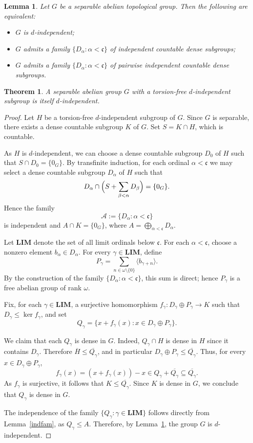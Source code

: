 \documentclass[10pt,a4paper]{amsart}
\newtheorem{lemma}{Lemma}
\newtheorem{theorem}{Theorem}
\newcommand{\LIM}{\mathbf{LIM}}
\def\c {{\mathfrak{c}}}
\begin{document}
\begin{lemma}\label{Le:eq}
Let $G$ be a separable abelian topological group. Then the following are equivalent:
\begin{itemize}
\item[(1)] $G$ is $d$-independent;
\item[(2)] $G$ admits a family $\{D_\alpha:\alpha<\mathfrak c\}$ of independent countable dense subgroups;
\item[(3)] $G$ admits a family $\{D_\alpha:\alpha<\mathfrak c\}$ of pairwise independent countable dense subgroups.
\end{itemize}
\end{lemma}

\begin{theorem}\label{Th:eq}
A separable abelian group $G$ with a torsion-free $d$-independent subgroup
is itself $d$-independent.
\end{theorem}

\begin{proof}
Let $H$ be a torsion-free $d$-independent subgroup of $G$.
Since $G$ is separable, there exists a dense countable subgroup $K$ of $G$.
Set $S=K\cap H$, which is countable.

As $H$ is $d$-independent, we can choose a dense countable subgroup
$D_0$ of $H$ such that $S\cap D_0=\{0_G\}$.
By transfinite induction, for each ordinal $\alpha<\mathfrak{c}$ we may select
a dense countable subgroup $D_\alpha$ of $H$ such that
\[
D_\alpha\cap\Bigl(S+\sum_{\beta<\alpha}D_\beta\Bigr)=\{0_G\}.
\]
Hence the family
\[
\mathcal{A}:=\{D_\alpha:\alpha<\mathfrak{c}\}
\]
is independent and $A\cap K=\{0_G\}$, where $A=\bigoplus_{\alpha<\c} D_\alpha$.

Let $\mathbf{LIM}$ denote the set of all limit ordinals below $\mathfrak{c}$.
For each $\alpha<\mathfrak{c}$, choose a nonzero element
$b_\alpha\in D_\alpha$.
For every $\gamma\in\mathbf{LIM}$, define
\[
P_\gamma=\sum_{n\in\omega\setminus\{0\}}\langle b_{\gamma+n}\rangle.
\]
%
By the construction of the family $\{D_\alpha:\alpha<\mathfrak{c}\}$, this sum
is direct; hence $P_\gamma$ is a free abelian group of rank $\omega$.

Fix, for each $\gamma\in\mathbf{LIM}$, a surjective homomorphism
$f_\gamma\colon D_\gamma\oplus P_\gamma\to K$ such that
$D_\gamma\leq\ker f_\gamma$, and set
\[
Q_\gamma=\{x+f_\gamma(x):x\in D_\gamma\oplus P_\gamma\}.
\]

We claim that each $Q_\gamma$ is dense in $G$.
Indeed, $Q_\gamma\cap H$ is dense in $H$ since it contains $D_\gamma$.
Therefore $\overline{H}\leq\overline{Q_\gamma}$, and in particular
$D_\gamma\oplus P_\gamma\leq\overline{Q_\gamma}$.
Thus, for every $x\in D_\gamma\oplus P_\gamma$,
\[
f_\gamma(x)=(x+f_\gamma(x))-x\in Q_\gamma+\overline{Q_\gamma}
\subseteq\overline{Q_\gamma}.
\]
As $f_\gamma$ is surjective, it follows that $K\leq\overline{Q_\gamma}$.
Since $K$ is dense in $G$, we conclude that $Q_\gamma$ is dense in $G$.

The independence of the family
$\{Q_\gamma: \gamma\in \LIM\}$
follows directly from Lemma~\ref{indfam}, as $Q_\gamma\leq A$.
Therefore, by Lemma~\ref{Le:eq}, the group $G$ is $d$-independent.
\end{proof}
\end{document}
